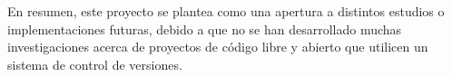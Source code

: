 \documentclass[a4paper, 12pt]{book}
\begin{document}
En resumen, este proyecto se plantea como una apertura a distintos estudios o implementaciones futuras, debido a que no se han desarrollado muchas investigaciones acerca de proyectos de código libre 
y abierto que utilicen un sistema de control de versiones.



\cleardoublepage

\nocite{*}


\end{document}
